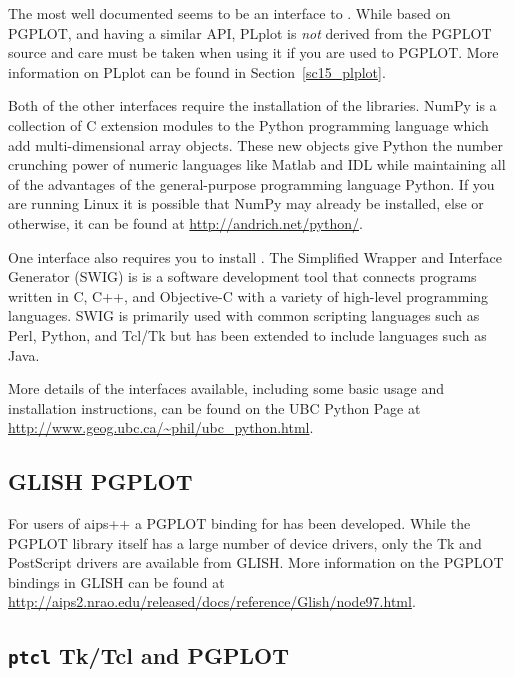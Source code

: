 \documentclass[twoside,11pt]{starlink}
\begin{document}
The most well documented seems to be an interface to
. While
based on PGPLOT, and having a similar API, PLplot is \emph{not} derived
from the PGPLOT source and care must be taken when using it if you are
used to PGPLOT. More information on PLplot can be found in
Section~\ref{sc15_plplot}.



Both of the other interfaces require the installation of the
libraries. NumPy is a collection of C extension modules to the Python
programming language which add multi-dimensional array objects. These
new objects give Python the number crunching power of numeric
languages like Matlab and IDL while maintaining all of the advantages
of the general-purpose programming language Python. If you are running
Linux it is possible that NumPy may already be installed, else or
otherwise, it can be found at \url{http://andrich.net/python/}.

One interface also requires you to install
. The Simplified Wrapper
and Interface Generator (SWIG) is is a software development tool that
connects programs written in C, C++, and Objective-C with a variety of
high-level programming languages. SWIG is primarily used with common
scripting languages such as Perl, Python, and Tcl/Tk but has been
extended to include languages such as Java.

More details of the interfaces available, including some basic usage
and installation instructions, can be found on the UBC Python Page at
\url{http://www.geog.ubc.ca/~phil/ubc_python.html}.

\subsection{GLISH PGPLOT\label{sc15_pgglish}}

For users of aips++ a PGPLOT binding for
 has been
developed. While the PGPLOT library itself has a large number of
device drivers, only the Tk and PostScript drivers are available from
GLISH. More information on the PGPLOT bindings in GLISH can be found
at \url{http://aips2.nrao.edu/released/docs/reference/Glish/node97.html}.



\subsection{\texttt{ptcl} Tk/Tcl and PGPLOT\label{sc15_pgtcl}}
\end{document}
